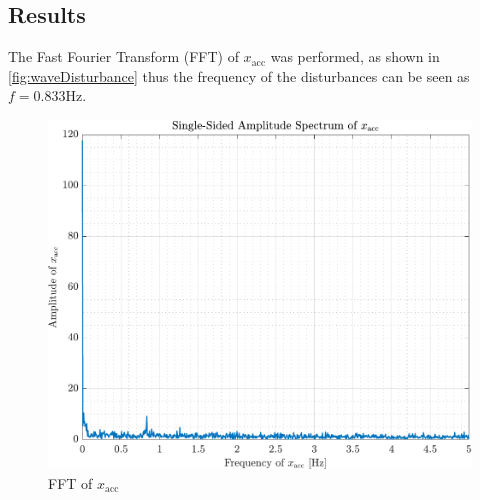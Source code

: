 \subsection*{Results}
The Fast Fourier Transform (FFT) of $x_\mathrm{acc}$ was performed, as shown in \autoref{fig:waveDisturbance} thus the frequency of the disturbances can be seen as $f = 0.833 \mathrm{Hz}$.
%
\begin{figure}[H]
   \includegraphics[width=.7\textwidth]{figures/waveDisturbance}
   \caption{FFT of $x_\mathrm{acc}$}
   \label{fig:waveDisturbance}
\end{figure}
